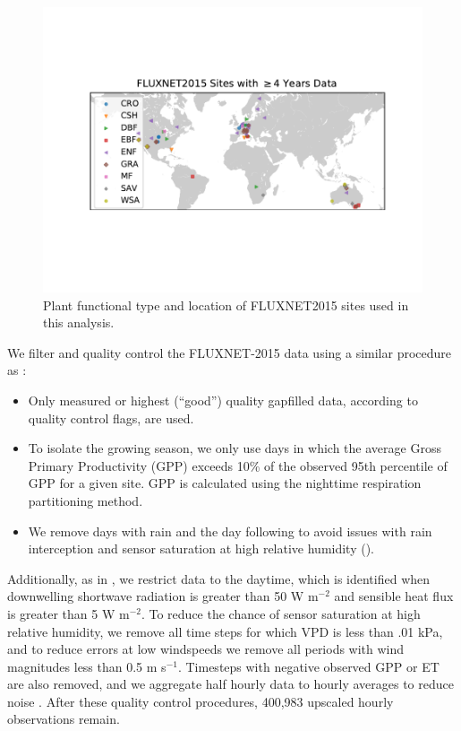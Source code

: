 \documentclass[12pt]{article}
\begin{document}
\begin{figure}[h]
  \centering \includegraphics[trim={0 3cm 0 3cm}, clip]{./map.pdf}
  \caption{Plant functional type and location of FLUXNET2015 sites
    used in this analysis.}
  \label{map_fig}
\end{figure}
We filter and quality control the FLUXNET-2015 data using a similar
procedure as \cite{Zhou_2015}:

\begin{itemize}
\item Only measured or highest (``good'') quality gapfilled data,
  according to quality control flags, are used.
\item To isolate the growing season, we only use days in which the
  average Gross Primary Productivity (GPP) exceeds 10\% of the
  observed 95th percentile of GPP for a given site. GPP is calculated
  using the nighttime respiration partitioning method.
\item We remove days with rain and the day following to avoid issues
  with rain interception and sensor saturation at high relative
  humidity (\cite{Medlyn_2017}).
\end{itemize}
Additionally, as in \citet{Lin_2018}, we restrict data to the daytime,
which is identified when downwelling shortwave radiation is greater
than 50 W m$^{-2}$ and sensible heat flux is greater than 5 W
m$^{-2}$. To reduce the chance of sensor saturation at high relative
humidity, we remove all time steps for which VPD is less than .01 kPa,
and to reduce errors at low windspeeds we remove all periods with wind
magnitudes less than 0.5 m s$^{-1}$. Timesteps with negative observed
GPP or ET are also removed, and we aggregate half hourly data to
hourly averages to reduce noise \citep{Lin_2018}. After these quality
control procedures, 400,983 upscaled hourly observations remain.
\end{document}
